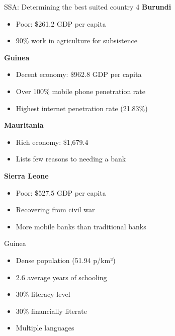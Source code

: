 \documentclass[10pt]{beamer}
\begin{document}
\begin{frame}{SSA: Determining the best suited country 4}
    \vspace{.5cm}
    \textbf{Burundi}
    \begin{itemize}
        \item Poor: \$261.2 GDP per capita
        \item 90\% work in agriculture for subsistence
    \end{itemize}
    \textbf{Guinea}
    \begin{itemize}
        \item Decent economy: \$962.8 GDP per capita
        \item Over 100\% mobile phone penetration rate
        \item Highest internet penetration rate (21.83\%)
    \end{itemize}
    \textbf{Mauritania}
    \begin{itemize}
        \item Rich economy: \$1,679.4
        \item Lists few reasons to needing a bank
    \end{itemize}
    \textbf{Sierra Leone}
    \begin{itemize}
        \item Poor: \$527.5 GDP per capita
        \item Recovering from civil war
        \item More mobile banks than traditional banks
    \end{itemize}
\end{frame}

\begin{frame}{Guinea}
\begin{itemize}
\item Dense population (51.94 p/km²)
\item 2.6 average years of schooling
\item 30\% literacy level
\item 30\% financially literate
\item Multiple languages
\end{itemize}
\end{frame}
\end{document}

